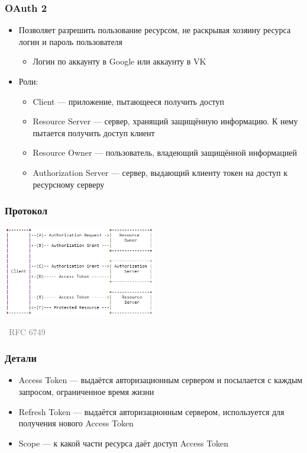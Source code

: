 \documentclass[xetex,mathserif,serif]{beamer}
\newcommand{\attribution}[1] {
\vspace{-5mm}\begin{flushright}\begin{scriptsize}\textcolor{gray}{\textcopyright\, #1}\end{scriptsize}\end{flushright}
}
\begin{document}
	\begin{frame}
		\frametitle{OAuth 2}
		\begin{itemize}
			\item Позволяет разрешить пользование ресурсом, не раскрывая хозяину ресурса логин и пароль пользователя
			\begin{itemize}
				\item Логин по аккаунту в Google или аккаунту в VK
			\end{itemize}
			\item Роли:
			\begin{itemize}
				\item Client --- приложение, пытающееся получить доступ
				\item Resource Server --- сервер, хранящий защищённую информацию. К нему пытается получить доступ клиент
				\item Resource Owner --- пользователь, владеющий защищённой информацией
				\item Authorization Server --- сервер, выдающий клиенту токен на доступ к ресурсному серверу
			\end{itemize}
		\end{itemize}
	\end{frame}

	\begin{frame}
		\frametitle{Протокол}
		\begin{center}
			\includegraphics[width=0.5\textwidth]{oauth.png}
			\attribution{RFC 6749}
		\end{center}
	\end{frame}

	\begin{frame}
		\frametitle{Детали}
		\begin{itemize}
			\item Access Token --- выдаётся авторизационным сервером и посылается с каждым запросом, ограниченное время жизни
			\item Refresh Token --- выдаётся авторизационным сервером, используется для получения нового Access Token
			\item Scope --- к какой части ресурса даёт доступ Access Token
		\end{itemize}
	\end{frame}
\end{document}
